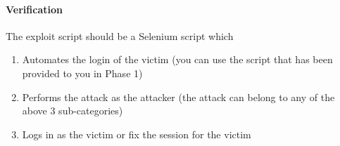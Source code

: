 \documentclass{article}[10pt]
\begin{document}
\paragraph{Verification}
The exploit script should be a Selenium script which
\begin{enumerate}
	\item Automates the login of the victim (you can use the script that has been provided to you in Phase 1)
	\item Performs the attack as the attacker (the attack can belong to any of the above 3 sub-categories)
	\item Logs in as the victim or fix the session for the victim
\end{enumerate}
\end{document}
